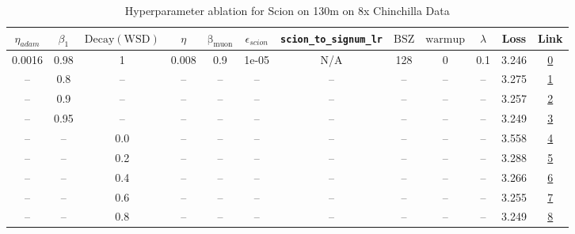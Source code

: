 \begin{table}[H]
\centering
\caption{Hyperparameter ablation for Scion on 130m on 8x Chinchilla Data}
\label{tab:ablation_scion_130m_8}
\begin{tabular}{cccccccccccc}
\toprule
$\eta_{adam}$ & $\beta_1$ & $\mathrm{Decay (WSD)}$ & $\eta$ & $\mathrm{\beta_{muon}}$ & $\epsilon_{scion}$ & \texttt{scion\_to\_signum\_lr} & $\mathrm{BSZ}$ & $\mathrm{warmup}$ & $\lambda$ & Loss & Link \\
\midrule
0.0016 & 0.98 & 1 & 0.008 & 0.9 & 1e-05 & N/A & 128 & 0 & 0.1 & 3.246 & \href{https://wandb.ai/stanford-mercury/optimizer-scaling/runs/sweep-130m-21B-scion51ccaelr0.008-wd0.1-minlr0-warmup0-b10.98-gn-4abd83}{0} \\
\midrule
-- & 0.8 & -- & -- & -- & -- & -- & -- & -- & -- & 3.275 & \href{https://wandb.ai/stanford-mercury/optimizer-scaling/runs/sweep-130m-21B-scion1d7c34lr0.008-wd0.1-minlr0-warmup0-b10.8-gn2-fd6d80}{1} \\
-- & 0.9 & -- & -- & -- & -- & -- & -- & -- & -- & 3.257 & \href{https://wandb.ai/stanford-mercury/optimizer-scaling/runs/sweep-130m-21B-scion766235lr0.008-wd0.1-minlr0-warmup0-b10.9-gn2-b7a715}{2} \\
-- & 0.95 & -- & -- & -- & -- & -- & -- & -- & -- & 3.249 & \href{https://wandb.ai/stanford-mercury/optimizer-scaling/runs/sweep-130m-21B-scionj3bd025lr0.008-wd0.1-minlr0-warmup0-b10.95-g-681640}{3} \\
-- & -- & 0.0 & -- & -- & -- & -- & -- & -- & -- & 3.558 & \href{https://wandb.ai/stanford-mercury/optimizer-scaling/runs/sweep-130m-21B-scion5791a0lr0.008-wd0.1-minlr0-warmup0-b10.98-gn-7d7f4f}{4} \\
-- & -- & 0.2 & -- & -- & -- & -- & -- & -- & -- & 3.288 & \href{https://wandb.ai/stanford-mercury/optimizer-scaling/runs/sweep-130m-21B-sciona129e1lr0.008-wd0.1-minlr0-warmup0-b10.98-gn-c5ab97}{5} \\
-- & -- & 0.4 & -- & -- & -- & -- & -- & -- & -- & 3.266 & \href{https://wandb.ai/stanford-mercury/optimizer-scaling/runs/sweep-130m-21B-scionk8eae89lr0.008-wd0.1-minlr0-warmup0-b10.98-g-10c992}{6} \\
-- & -- & 0.6 & -- & -- & -- & -- & -- & -- & -- & 3.255 & \href{https://wandb.ai/stanford-mercury/optimizer-scaling/runs/sweep-130m-21B-scionk6861bflr0.008-wd0.1-minlr0-warmup0-b10.98-g-c52551}{7} \\
-- & -- & 0.8 & -- & -- & -- & -- & -- & -- & -- & 3.249 & \href{https://wandb.ai/stanford-mercury/optimizer-scaling/runs/sweep-130m-21B-scione2dcaclr0.008-wd0.1-minlr0-warmup0-b10.98-gn-61fe4b}{8} \\

\end{tabular}
\end{table}
